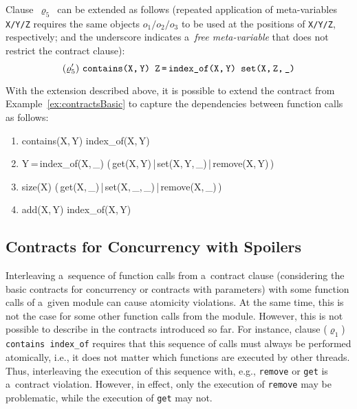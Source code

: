 Clause~$ \varrho_5 $~can be extended as follows (repeated application of meta-variables \texttt{X/Y/Z} requires the same objects $ o_1/o_2/o_3 $ to be used at the positions of \texttt{X/Y/Z}, respectively; and the underscore indicates a~\emph{free meta-variable} that does not restrict
the contract clause):
$$
    (\varrho^\prime_5)\ \text{\texttt{contains(X,\,Y) Z\,=\,index\_of(X,\,Y) set(X,\,Z,\,\_)}}
$$

\begin{example}
    With the extension described above, it is possible to extend the contract from Example~\ref{ex:contractsBasic} to capture the dependencies between function calls as follows:
    \begin{enumerate}[label={($ \varrho^\prime_{\arabic*} $)}]
        \tt

        \item contains(X,\,Y) index\_of(X,\,Y)

        \item Y\,=\,index\_of(X,\,\_) (\,get(X,\,Y)\,|\,set(X,\,Y,\,\_)\,|\,remove(X,\,Y)\,)

        \item size(X) (\,get(X,\,\_)\,|\,set(X,\,\_,\,\_)\,|\,remove(X,\,\_)\,)

        \item add(X,\,Y) index\_of(X,\,Y)
    \end{enumerate}
\end{example}

\subsection{Contracts for Concurrency with Spoilers}
\label{sec:contractsSpoilers}

Interleaving a~sequence of function calls from a~contract clause (considering the basic contracts for concurrency or contracts with parameters) with some function calls of a~given module can cause atomicity violations. At the same time, this is not the case for some other function calls from the module. However, this is not possible to describe in the contracts introduced so far. For instance, clause ($ \varrho_1 $) \texttt{contains index\_of} requires that this sequence of calls must always be performed atomically, i.e., it does not matter which functions are executed by other threads. Thus, interleaving the execution of this sequence with, e.g., \texttt{remove} or \texttt{get} is a~contract violation. However, in effect, only the execution of \texttt{remove} may be problematic, while the execution of \texttt{get} may not.


